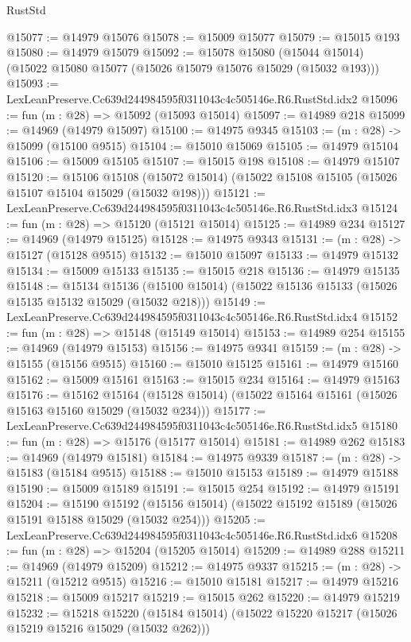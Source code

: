 \begin{lexlean}{RustStd}
\begin{coremodule}
@15077 := @14979 @15076
@15078 := @15009 @15077
@15079 := @15015 @193
@15080 := @14979 @15079
@15092 := @15078
    @15080
    (@15044 @15014)
    (@15022 @15080 @15077 (@15026 @15079 @15076 @15029 (@15032 @193)))
@15093 := LexLeanPreserve.Cc639d244984595f0311043c4c505146e.R6.RustStd.idx2
@15096 := fun (m : @28) => @15092 (@15093 @15014)
@15097 := @14989 @218
@15099 := @14969 (@14979 @15097)
@15100 := @14975 @9345
@15103 := (m : @28) -> @15099 (@15100 @9515)
@15104 := @15010 @15069
@15105 := @14979 @15104
@15106 := @15009 @15105
@15107 := @15015 @198
@15108 := @14979 @15107
@15120 := @15106
    @15108
    (@15072 @15014)
    (@15022 @15108 @15105 (@15026 @15107 @15104 @15029 (@15032 @198)))
@15121 := LexLeanPreserve.Cc639d244984595f0311043c4c505146e.R6.RustStd.idx3
@15124 := fun (m : @28) => @15120 (@15121 @15014)
@15125 := @14989 @234
@15127 := @14969 (@14979 @15125)
@15128 := @14975 @9343
@15131 := (m : @28) -> @15127 (@15128 @9515)
@15132 := @15010 @15097
@15133 := @14979 @15132
@15134 := @15009 @15133
@15135 := @15015 @218
@15136 := @14979 @15135
@15148 := @15134
    @15136
    (@15100 @15014)
    (@15022 @15136 @15133 (@15026 @15135 @15132 @15029 (@15032 @218)))
@15149 := LexLeanPreserve.Cc639d244984595f0311043c4c505146e.R6.RustStd.idx4
@15152 := fun (m : @28) => @15148 (@15149 @15014)
@15153 := @14989 @254
@15155 := @14969 (@14979 @15153)
@15156 := @14975 @9341
@15159 := (m : @28) -> @15155 (@15156 @9515)
@15160 := @15010 @15125
@15161 := @14979 @15160
@15162 := @15009 @15161
@15163 := @15015 @234
@15164 := @14979 @15163
@15176 := @15162
    @15164
    (@15128 @15014)
    (@15022 @15164 @15161 (@15026 @15163 @15160 @15029 (@15032 @234)))
@15177 := LexLeanPreserve.Cc639d244984595f0311043c4c505146e.R6.RustStd.idx5
@15180 := fun (m : @28) => @15176 (@15177 @15014)
@15181 := @14989 @262
@15183 := @14969 (@14979 @15181)
@15184 := @14975 @9339
@15187 := (m : @28) -> @15183 (@15184 @9515)
@15188 := @15010 @15153
@15189 := @14979 @15188
@15190 := @15009 @15189
@15191 := @15015 @254
@15192 := @14979 @15191
@15204 := @15190
    @15192
    (@15156 @15014)
    (@15022 @15192 @15189 (@15026 @15191 @15188 @15029 (@15032 @254)))
@15205 := LexLeanPreserve.Cc639d244984595f0311043c4c505146e.R6.RustStd.idx6
@15208 := fun (m : @28) => @15204 (@15205 @15014)
@15209 := @14989 @288
@15211 := @14969 (@14979 @15209)
@15212 := @14975 @9337
@15215 := (m : @28) -> @15211 (@15212 @9515)
@15216 := @15010 @15181
@15217 := @14979 @15216
@15218 := @15009 @15217
@15219 := @15015 @262
@15220 := @14979 @15219
@15232 := @15218
    @15220
    (@15184 @15014)
    (@15022 @15220 @15217 (@15026 @15219 @15216 @15029 (@15032 @262)))

\end{coremodule}
\end{lexlean}
